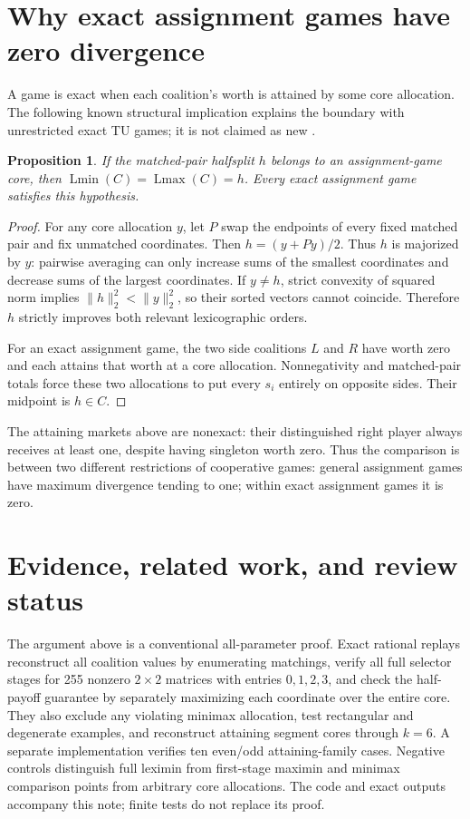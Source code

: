 \documentclass[11pt]{article}
\newtheorem{proposition}[theorem]{Proposition}
\newcommand{\Lmin}{\operatorname{Lmin}}
\newcommand{\Lmax}{\operatorname{Lmax}}
\begin{document}
\section{Why exact assignment games have zero divergence}
A game is exact when each coalition's worth is attained by some core
allocation. The following known structural implication explains the
boundary with unrestricted exact TU games; it is not claimed as new
\cite{llerena,solymosi-raghavan}.
\begin{proposition}\label{prop:exact}
If the matched-pair halfsplit $h$ belongs to an assignment-game core,
then $\Lmin(C)=\Lmax(C)=h$. Every exact assignment game satisfies this
hypothesis.
\end{proposition}
\begin{proof}
For any core allocation $y$, let $P$ swap the endpoints of every fixed
matched pair and fix unmatched coordinates. Then $h=(y+Py)/2$.
Thus $h$ is majorized by $y$: pairwise averaging can only increase sums
of the smallest coordinates and decrease sums of the largest coordinates.
If $y\ne h$, strict convexity of squared norm implies
$\|h\|_2^2<\|y\|_2^2$, so their sorted vectors cannot coincide.
Therefore $h$ strictly improves both relevant lexicographic orders.

For an exact assignment game, the two side coalitions $L$ and $R$ have
worth zero and each attains that worth at a core allocation.
Nonnegativity and matched-pair totals force these two allocations to
put every $s_i$ entirely on opposite sides. Their midpoint is $h\in C$.
\end{proof}
The attaining markets above are nonexact: their distinguished right
player always receives at least one, despite having singleton worth zero.
Thus the comparison is between two different restrictions of cooperative
games: general assignment games have maximum divergence tending to one;
within exact assignment games it is zero.

\section{Evidence, related work, and review status}
The argument above is a conventional all-parameter proof. Exact rational
replays reconstruct all coalition values by enumerating matchings,
verify all full selector stages for 255 nonzero $2\times2$ matrices
with entries $0,1,2,3$, and check the half-payoff guarantee by separately
maximizing each coordinate over the entire core. They also exclude any
violating minimax allocation, test rectangular and degenerate examples,
and reconstruct attaining segment cores through $k=6$.
A separate implementation verifies ten even/odd attaining-family cases.
Negative controls distinguish full leximin from first-stage maximin and
minimax comparison points from arbitrary core allocations. The code and
exact outputs accompany this note; finite tests do not replace its proof.
\end{document}
